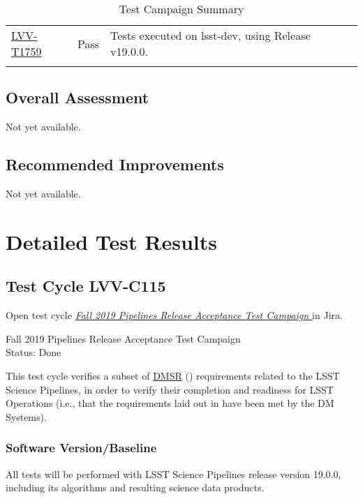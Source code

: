 \documentclass[DM,lsstdraft,STR,toc]{lsstdoc}
\begin{document}
\begin{longtable}{p{2cm}p{2.5cm}p{9cm}p{2.5cm}}
\begin{minipage}[]{9cm}
    \medskip
    \end{minipage}
    &
    \\\hline
\href{https://jira.lsstcorp.org/secure/Tests.jspa#/testCase/LVV-T1759}{LVV-T1759}
    & Pass &
    \begin{minipage}[]{9cm}
    \smallskip
     Tests executed on lsst-dev, using Release v19.0.0.

    \medskip
    \end{minipage}
    &
    \\\hline
\caption{Test Campaign Summary}
\label{table:summary}
\end{longtable}

\subsection{Overall Assessment}
\label{sect:overallassessment}

Not yet available.

\subsection{Recommended Improvements}
\label{sect:recommendations}

Not yet available.

\newpage
\section{Detailed Test Results}
\label{sect:detailedtestresults}

\subsection{Test Cycle LVV-C115 }

Open test cycle {\it \href{https://jira.lsstcorp.org/secure/Tests.jspa#/testrun/LVV-C115}{ Fall 2019 Pipelines Release Acceptance Test Campaign
}} in Jira.

 Fall 2019 Pipelines Release Acceptance Test Campaign
\\
Status: Done

 This test cycle verifies a subset of
\href{https://lse-61.lsst.io/}{DMSR} () requirements related to
the LSST Science Pipelines, in order to verify their completion and
readiness for LSST Operations (i.e., that the requirements laid out in
 have been met by the DM Systems).


\subsubsection{Software Version/Baseline}
 All tests will be performed with LSST Science Pipelines release version
19.0.0, including its algorithms and resulting science data products.~
\end{document}

